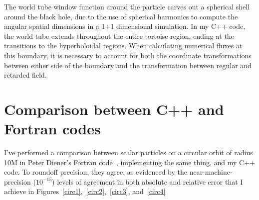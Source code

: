 The world tube window function around the particle carves out a spherical shell around the black hole, due to the use of spherical harmonics to compute the angular spatial dimensions in a 1+1 dimensional simulation. In my C++ code, the world tube extends throughout the entire tortoise region, ending at the transitions to the hyperboloidal regions. When calculating numerical fluxes at this boundary, it is necessary to account for both the coordinate transformations between either side of the boundary and the transformation between regular and retarded field.




\section{Comparison between C++ and Fortran codes}

I've performed a comparison between scalar particles on a circular orbit of radius 10M in Peter Diener's Fortran code~\cite{heffernan_ottewil_wardell_modesum_basisForCode}, implementing the same thing, and my C++ code. To roundoff precision, they agree, as evidenced by the near-machine-precision ($10^{-15}$) levels of agreement in both absolute and relative error that I achieve in Figures~\ref{circ1},~\ref{circ2},~\ref{circ3}, and~\ref{circ4}

